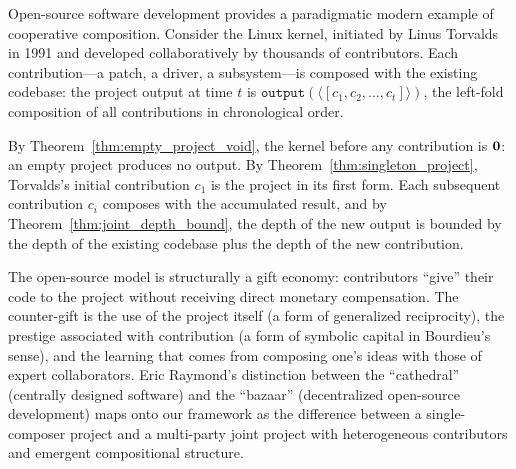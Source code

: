 \begin{example}
\label{ex:open-source}
Open-source software development provides a paradigmatic modern example
of cooperative composition.  Consider the Linux kernel, initiated by
Linus Torvalds in 1991 and developed collaboratively by thousands of
contributors.  Each contribution---a patch, a driver, a subsystem---is
composed with the existing codebase: the project output at time $t$ is
$\texttt{output}(\langle [c_1, c_2, \ldots, c_t] \rangle)$, the
left-fold composition of all contributions in chronological order.

By Theorem~\ref{thm:empty_project_void}, the kernel before any
contribution is $\mathbf{0}$: an empty project produces no output.  By
Theorem~\ref{thm:singleton_project}, Torvalds's initial contribution
$c_1$ is the project in its first form.  Each subsequent contribution
$c_i$ composes with the accumulated result, and by
Theorem~\ref{thm:joint_depth_bound}, the depth of the new output is
bounded by the depth of the existing codebase plus the depth of the new
contribution.

The open-source model is structurally a gift economy: contributors
``give'' their code to the project without receiving direct monetary
compensation.  The counter-gift is the use of the project itself (a
form of generalized reciprocity), the prestige associated with
contribution (a form of symbolic capital in Bourdieu's sense), and the
learning that comes from composing one's ideas with those of expert
collaborators.  Eric Raymond's distinction between the ``cathedral''
(centrally designed software) and the ``bazaar'' (decentralized
open-source development) maps onto our framework as the difference
between a single-composer project and a multi-party joint project with
heterogeneous contributors and emergent compositional structure.
\end{example}

